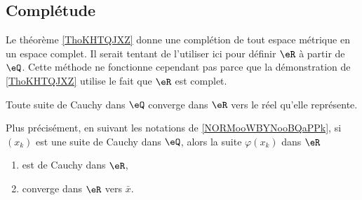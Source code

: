 \subsection{Complétude}

Le théorème \ref{ThoKHTQJXZ} donne une complétion de tout espace métrique en un espace complet. Il serait tentant de l'utiliser ici pour définir \( \eR\) à partir de \( \eQ\). Cette méthode ne fonctionne cependant pas parce que la démonstration de \ref{ThoKHTQJXZ} utilise le fait que \( \eR\) est complet.

\begin{lemma}      \label{LemooRTGFooYVstwS}
    Toute suite de Cauchy dans \( \eQ\) converge dans \( \eR\) vers le réel qu'elle représente.

    Plus précisément, en suivant les notations de \ref{NORMooWBYNooBQaPPk}, si \( (x_k)\) est une suite de Cauchy dans \( \eQ\), alors la suite \( \varphi(x_k)\) dans \( \eR\)
    \begin{enumerate}
        \item
            est de Cauchy dans \( \eR\),
        \item
            converge dans \( \eR\) vers \( \bar x\).
    \end{enumerate}
\end{lemma}


